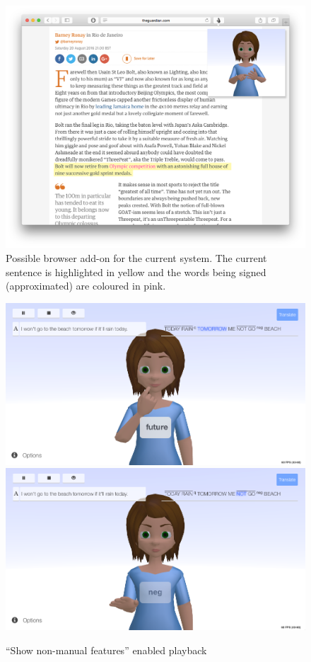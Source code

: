 \documentclass[12pt]{ociamthesis}  %
\begin{document}
\begin{figure}[H]
	\centering
    \includegraphics[scale=0.35]{chapter6/concept}
    \caption[Possible browser add-on for the current system]{Possible browser add-on for the current system. The current sentence is highlighted in yellow and the words being signed (approximated) are coloured in pink.}
    \label{fig:concept}
\end{figure}	

\begin{figure}[h]
	\centering
	\includegraphics[scale=0.4]{appendix/future}
    \includegraphics[scale=0.4]{appendix/neg}
    \caption{``Show non-manual features'' enabled playback}
    \label{fig:non-man-app}
\end{figure}	
\end{document}
